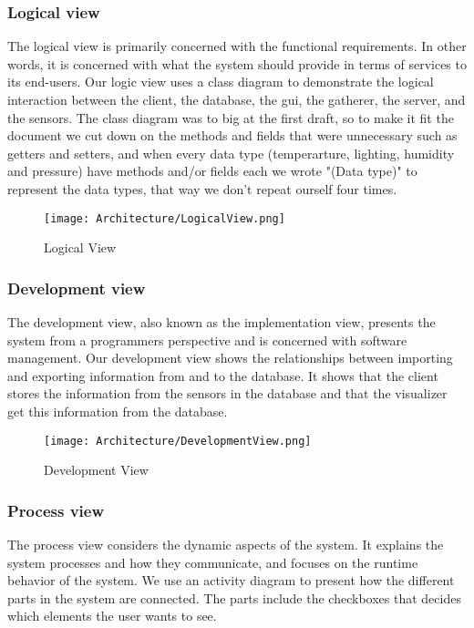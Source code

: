 \documentclass[../document.tex]{subfiles}
\begin{document}
\subsubsection{Logical view}		
The logical view is primarily concerned with the functional requirements. In other words, it is concerned with what the system should provide in terms of services to its end-users. Our logic view uses a class diagram to demonstrate the logical interaction between the client, the database, the gui, the gatherer, the server, and the sensors. The class diagram was to big at the first draft, so to make it fit the document we cut down on the methods and fields that were unnecessary such as getters and setters, and when every data type (temperarture, lighting, humidity and pressure) have methods and/or fields each we wrote "(Data type)" to represent the data types, that way we don't repeat ourself four times. 

\begin{figure}[H]
	\centering
	\texttt{[image: Architecture/LogicalView.png]}
	\caption{Logical View}
\end{figure}

\subsubsection{Development view}
The development view, also known as the implementation view,  presents the system from a programmers perspective and is concerned with software management. Our development view shows the relationships between importing and exporting information from and to the database. It shows that the client stores the information from the sensors in the database and that the visualizer get this information from the database.

\begin{figure}[H]
	\centering
	\texttt{[image: Architecture/DevelopmentView.png]}
	\caption{Development View}
\end{figure}

\subsubsection{Process view}
The process view considers the dynamic aspects of the system. It explains the system processes and how they communicate, and focuses on the runtime behavior of the system. We use an activity diagram to present how the different parts in the system are connected. The parts include the checkboxes that decides which elements the user wants to see. 
\end{document}
